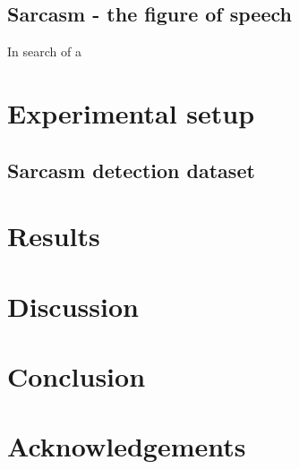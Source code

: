 \documentclass[10pt, a4paper]{article}
\begin{document}
\subsection{Sarcasm - the figure of speech}
In search of a 

\section{Experimental setup}
\subsection{Sarcasm detection dataset}
\citep{iSarcasm}
\section{Results}

\section{Discussion}

\section{Conclusion}

\section*{Acknowledgements}


 
\end{document}
